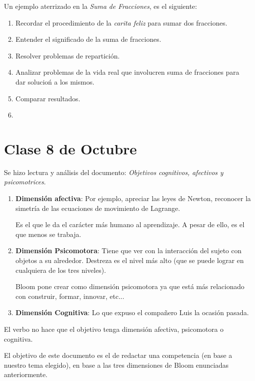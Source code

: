 \documentclass[12pt]{report}
\theoremstyle{largebreak}
\begin{document}
    Un ejemplo aterrizado en la \textit{Suma de Fracciones}, es el siguiente:
    \begin{enumerate}
        \item Recordar el procedimiento de la \textit{carita feliz} para sumar dos fracciones.
        \item Entender el significado de la suma de fracciones.
        \item Resolver problemas de repartición.
        \item Analizar problemas de la vida real que involucren suma de fracciones para dar solucioń a los mismos.
        \item Comparar resultados.
        \item 
    \end{enumerate}

    \section{Clase 8 de Octubre}

    Se hizo lectura y análisis del documento: \textit{Objetivos cognitivos, afectivos y psicomotrices}.

    \begin{enumerate}
        \item \textbf{Dimensión afectiva}: Por ejemplo, apreciar las leyes de Newton, reconocer la simetría de las ecuaciones de movimiento de Lagrange.
        
        Es el que le da el carácter más humano al aprendizaje. A pesar de ello, es el que menos se trabaja.
        \item \textbf{Dimensión Psicomotora}: Tiene que ver con la interacción del sujeto con objetos a su alrededor. Destreza es el nivel más alto (que se puede lograr en cualquiera de los tres niveles).
        
        Bloom pone crear como dimensión psicomotora ya que está más relacionado con construir, formar, innovar, etc...
        \item \textbf{Dimensión Cognitiva}: Lo que expuso el compañero Luis la ocasión pasada.
    \end{enumerate}

    El verbo no hace que el objetivo tenga dimensión afectiva, psicomotora o cognitiva.

    El objetivo de este documento es el de redactar una competencia (en base a nuestro tema elegido), en base a las tres dimensiones de Bloom enunciadas anteriormente.
\end{document}
